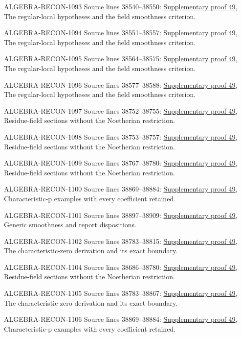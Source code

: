 \begin{AlgebraSourceRoutes}
\item[ALGEBRA-RECON-1093] Source lines 38540--38550: \hyperlink{algebra_smooth_fields_notes_20260928}{Supplementary proof 49}, The regular-local hypotheses and the field smoothness criterion.
\item[ALGEBRA-RECON-1094] Source lines 38551--38557: \hyperlink{algebra_smooth_fields_notes_20260928}{Supplementary proof 49}, The regular-local hypotheses and the field smoothness criterion.
\item[ALGEBRA-RECON-1095] Source lines 38564--38575: \hyperlink{algebra_smooth_fields_notes_20260928}{Supplementary proof 49}, The regular-local hypotheses and the field smoothness criterion.
\item[ALGEBRA-RECON-1096] Source lines 38577--38588: \hyperlink{algebra_smooth_fields_notes_20260928}{Supplementary proof 49}, The regular-local hypotheses and the field smoothness criterion.
\item[ALGEBRA-RECON-1097] Source lines 38752--38755: \hyperlink{algebra_smooth_fields_notes_20260928}{Supplementary proof 49}, Residue-field sections without the Noetherian restriction.
\item[ALGEBRA-RECON-1098] Source lines 38753--38757: \hyperlink{algebra_smooth_fields_notes_20260928}{Supplementary proof 49}, Residue-field sections without the Noetherian restriction.
\item[ALGEBRA-RECON-1099] Source lines 38767--38780: \hyperlink{algebra_smooth_fields_notes_20260928}{Supplementary proof 49}, Residue-field sections without the Noetherian restriction.
\item[ALGEBRA-RECON-1100] Source lines 38869--38884: \hyperlink{algebra_smooth_fields_notes_20260928}{Supplementary proof 49}, Characteristic-p examples with every coefficient retained.
\item[ALGEBRA-RECON-1101] Source lines 38897--38909: \hyperlink{algebra_smooth_fields_notes_20260928}{Supplementary proof 49}, Generic smoothness and report dispositions.
\item[ALGEBRA-RECON-1102] Source lines 38783--38815: \hyperlink{algebra_smooth_fields_notes_20260928}{Supplementary proof 49}, The characteristic-zero derivation and its exact boundary.
\item[ALGEBRA-RECON-1104] Source lines 38686--38780: \hyperlink{algebra_smooth_fields_notes_20260928}{Supplementary proof 49}, Residue-field sections without the Noetherian restriction.
\item[ALGEBRA-RECON-1105] Source lines 38783--38867: \hyperlink{algebra_smooth_fields_notes_20260928}{Supplementary proof 49}, The characteristic-zero derivation and its exact boundary.
\item[ALGEBRA-RECON-1106] Source lines 38869--38884: \hyperlink{algebra_smooth_fields_notes_20260928}{Supplementary proof 49}, Characteristic-p examples with every coefficient retained.
\end{AlgebraSourceRoutes}

